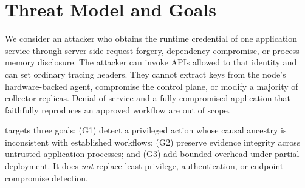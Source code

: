 \section{Threat Model and Goals}
\label{sec:threat}

We consider an attacker who obtains the runtime credential of one application
service through server-side request forgery, dependency compromise, or process
memory disclosure. The attacker can invoke APIs allowed to that identity and
can set ordinary tracing headers. They cannot extract keys from the node's
hardware-backed agent, compromise the control plane, or modify a majority of
collector replicas. Denial of service and a fully compromised application that
faithfully reproduces an approved workflow are out of scope.

\system{} targets three goals: (G1) detect a privileged action whose causal
ancestry is inconsistent with established workflows; (G2) preserve evidence
integrity across untrusted application processes; and (G3) add bounded overhead
under partial deployment. It does \emph{not} replace least privilege,
authentication, or endpoint compromise detection.

